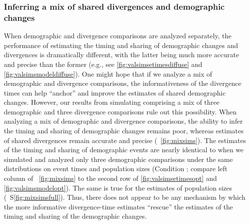 \ifembed{
    
}{}

\ifembed{
    
}{}

\subsubsection{Inferring a mix of shared divergences and demographic changes}

When demographic and divergence comparisons are analyzed separately, the
performance of estimating the timing and sharing of demographic changes and
divergences is dramatically different, with the latter being much more accurate
and precise than the former
(e.g., see
\figs
\ref{fig:valsimsetimesdiffuse}
and
\ref{fig:valsimsmodeldiffuse}).
One might hope that if we analyze a mix of demographic and divergence
comparisons, the informativeness of the divergence times can help ``anchor''
and improve the estimates of shared demographic changes.
However, our results from simulating \datasets comprising a mix of three
demographic and three divergence comparisons rule out this possibility.
When analyzing a mix of demographic and divergence comparisons, the ability to
infer the timing and sharing of demographic changes remains poor, whereas
estimates of shared divergences remain accurate and precise
(\fig{}~\ref{fig:mixsims}).
The estimates of the timing and sharing of demographic events are nearly
identical to when we simulated and analyzed only three demographic comparisons
under the same distributions on event times and population sizes
(Condition \vsimtwoinc; compare left column of \fig{}~\ref{fig:mixsims}
to the second row of \figs
\ref{fig:valsimsetimesopt}
and
\ref{fig:valsimsmodelopt}).
The same is true for the estimates of population sizes
(\fig{}~S\ref{fig:mixsimsfull}).
Thus, there does not appear to be any mechanism by which the more informative
divergence-time estimates ``rescue'' the estimates of the timing and sharing of
the demographic changes.

